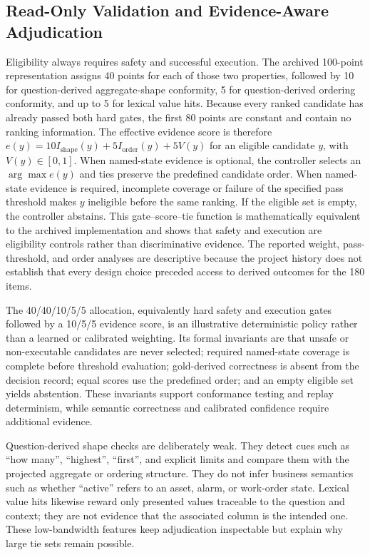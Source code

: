 \documentclass[information,article,submit,moreauthors]{Definitions/mdpi}
\begin{document}
\subsection{Read-Only Validation and Evidence-Aware Adjudication}

Eligibility always requires safety and successful execution. The archived 100-point representation assigns 40 points for each of those two properties, followed by 10 for question-derived aggregate-shape conformity, 5 for question-derived ordering conformity, and up to 5 for lexical value hits. Because every ranked candidate has already passed both hard gates, the first 80 points are constant and contain no ranking information. The effective evidence score is therefore $e(y)=10I_{\mathrm{shape}}(y)+5I_{\mathrm{order}}(y)+5V(y)$ for an eligible candidate $y$, with $V(y)\in[0,1]$. When named-state evidence is optional, the controller selects an $\arg\max e(y)$ and ties preserve the predefined candidate order. When named-state evidence is required, incomplete coverage or failure of the specified pass threshold makes $y$ ineligible before the same ranking. If the eligible set is empty, the controller abstains. This gate--score--tie function is mathematically equivalent to the archived implementation and shows that safety and execution are eligibility controls rather than discriminative evidence. The reported weight, pass-threshold, and order analyses are descriptive because the project history does not establish that every design choice preceded access to derived outcomes for the 180 items.

The 40/40/10/5/5 allocation, equivalently hard safety and execution gates followed by a 10/5/5 evidence score, is an illustrative deterministic policy rather than a learned or calibrated weighting. Its formal invariants are that unsafe or non-executable candidates are never selected; required named-state coverage is complete before threshold evaluation; gold-derived correctness is absent from the decision record; equal scores use the predefined order; and an empty eligible set yields abstention. These invariants support conformance testing and replay determinism, while semantic correctness and calibrated confidence require additional evidence.

Question-derived shape checks are deliberately weak. They detect cues such as ``how many'', ``highest'', ``first'', and explicit limits and compare them with the projected aggregate or ordering structure. They do not infer business semantics such as whether ``active'' refers to an asset, alarm, or work-order state. Lexical value hits likewise reward only presented values traceable to the question and context; they are not evidence that the associated column is the intended one. These low-bandwidth features keep adjudication inspectable but explain why large tie sets remain possible.
\end{document}
